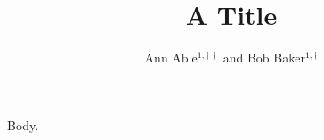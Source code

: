 \documentclass{revtex4-2}
\begin{document}
\title{A Title}
\author{Ann Able$^{1,\dagger\dagger}$ and Bob Baker$^{1,\dagger}$}
\maketitle
Body.
\end{document}
